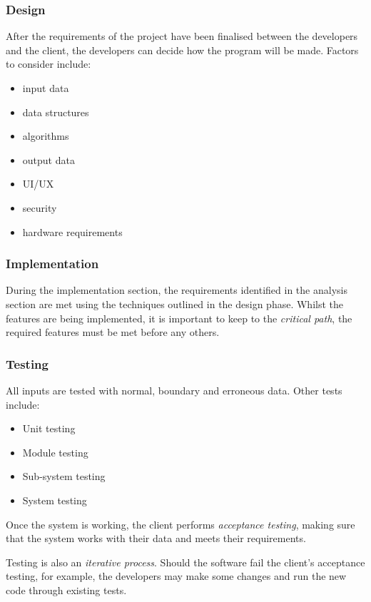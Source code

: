 \documentclass[9pt]{article}
\begin{document}
\subsubsection{Design}
\label{sec:org0770385}

After the requirements of the project have been finalised between the developers and the client, the developers can decide how the program will be made. Factors to consider include:

\begin{itemize}
\item input data
\item data structures
\item algorithms
\item output data
\item UI/UX
\item security
\item hardware requirements
\end{itemize}

\subsubsection{Implementation}
\label{sec:org0b64f94}

During the implementation section, the requirements identified in the analysis section are met using the techniques outlined in the design phase. Whilst the features are being implemented, it is important to keep to the \emph{critical path}, the required features must be met before any others.

\subsubsection{Testing}
\label{sec:orgb5be062}

All inputs are tested with normal, boundary and erroneous data. Other tests include:

\begin{itemize}
\item Unit testing
\item Module testing
\item Sub-system testing
\item System testing
\end{itemize}

Once the system is working, the client performs \emph{acceptance testing}, making sure that the system works with their data and meets their requirements.

Testing is also an \emph{iterative process}. Should the software fail the client's acceptance testing, for example, the developers may make some changes and run the new code through existing tests.
\end{document}
